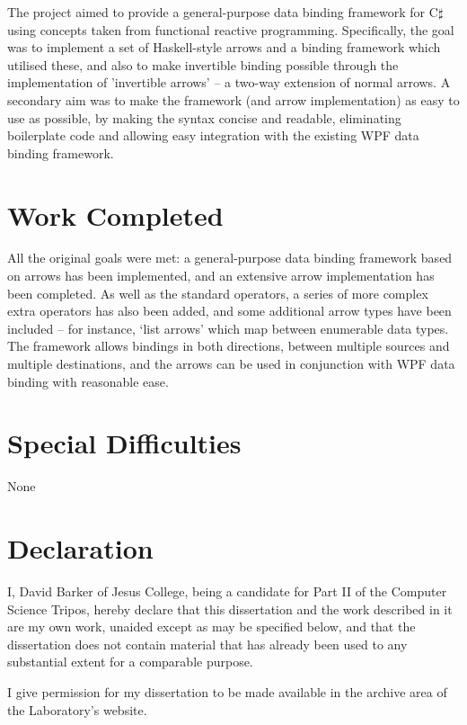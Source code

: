 \documentclass[12pt,twoside,notitlepage]{report}
\begin{document}
The project aimed to provide a general-purpose data binding framework for C$\sharp$ using concepts taken from functional reactive programming. Specifically, the goal was to implement a set of Haskell-style arrows and a binding framework which utilised these, and also to make invertible binding possible through the implementation of 'invertible arrows' -- a two-way extension of normal arrows. A secondary aim was to make the framework (and arrow implementation) as easy to use as possible, by making the syntax concise and readable, eliminating boilerplate code and allowing easy integration with the existing WPF data binding framework.

\section*{Work Completed}

All the original goals were met: a general-purpose data binding framework based on arrows has been implemented, and an extensive arrow implementation has been completed. As well as the standard operators, a series of more complex extra operators has also been added, and some additional arrow types have been included -- for instance, `list arrows' which map between enumerable data types. The framework allows bindings in both directions, between multiple sources and multiple destinations, and the arrows can be used in conjunction with WPF data binding with reasonable ease.


\section*{Special Difficulties}

None
 
\newpage
\section*{Declaration}

I, David Barker of Jesus College, being a candidate for Part II of
the Computer Science Tripos, hereby declare that this dissertation
and the work described in it are my own work, unaided except as may
be specified below, and that the dissertation does not contain
material that has already been used to any substantial extent for a
comparable purpose.

I give permission for my dissertation to be made available in the archive
area of the Laboratory's website.
\end{document}
